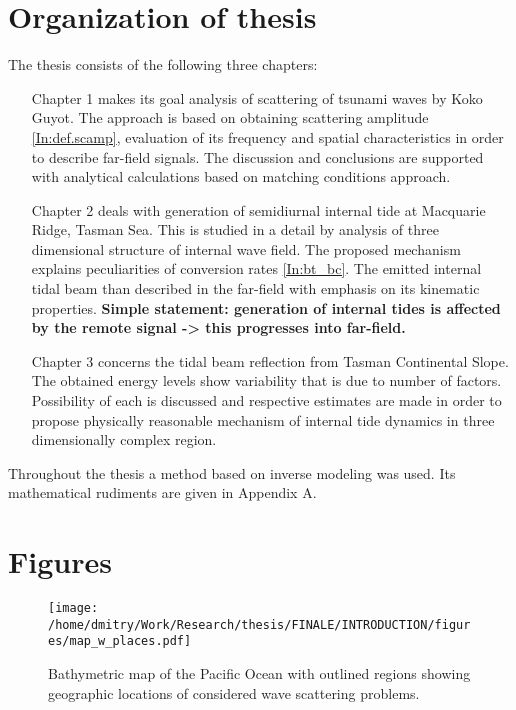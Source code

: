 \documentclass[12pt]{article}
\begin{document}
\section{Organization of thesis}
The thesis consists of the following three chapters:
\begin{enumerate}
	\item[Chapter 1] makes its goal analysis of scattering of tsunami waves by Koko Guyot. The 
	approach is based on obtaining scattering amplitude \eqref{In:def.scamp}, evaluation of its 
	frequency and spatial characteristics in order to describe far-field signals. The discussion 
	and conclusions are supported with analytical calculations based on matching conditions 
	approach.
	\item[Chapter 2] deals with generation of semidiurnal internal tide at Macquarie Ridge,  
	Tasman Sea. This is studied in a detail by analysis of three dimensional structure of 
	internal wave field. The proposed mechanism explains peculiarities of conversion rates 
	\eqref{In:bt_bc}. The emitted internal tidal beam than described in the far-field with emphasis 
	on its kinematic properties.
\textbf{Simple statement: generation of internal tides is affected by the remote signal -> 
this progresses into far-field.}
	\item[Chapter 3] concerns the tidal beam reflection from Tasman Continental Slope. The 
	obtained energy levels show variability that is due to number of factors. Possibility of each 
	is discussed and respective estimates are made in order to propose physically reasonable 
	mechanism of internal tide dynamics in three dimensionally complex region.

\end{enumerate}
Throughout the thesis a method based on inverse modeling was used. Its mathematical rudiments are 
given in Appendix A.

\section*{Figures}
\begin{figure}
	\texttt{[image: /home/dmitry/Work/Research/thesis/FINALE/INTRODUCTION/figures/map\_w\_places.pdf]}
	\caption{Bathymetric map of the Pacific Ocean with outlined regions showing geographic 
	locations of considered wave scattering problems.}
\end{figure}
	
\end{document}
